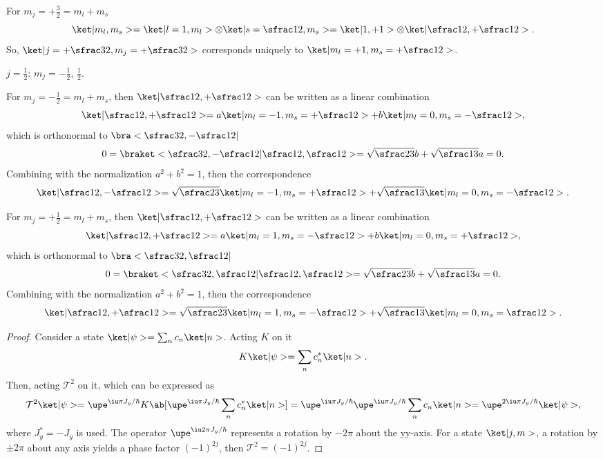 \begin{solution}
\begin{enumext}
\begin{enumext}
\begin{enumext}[label = \arabic*.]
\[        \]
        \item For $m_j = +\frac32 = m_l + m_s$
        \[
          \ket|m_l, m_s> = \ket|l = 1, m_l> \otimes \ket|s = \sfrac12, m_s>
        = \ket|1, +1> \otimes \ket|\sfrac12, +\sfrac12>.
        \]
        So, $\ket|j = +\sfrac32, m_j = +\sfrac32>$ corresponds uniquely to
        $\ket|m_l = +1, m_s = +\sfrac12>$.
      \end{enumext}
      \item $j = \frac12$: $m_j = -\frac12$, $\frac12$.
      \begin{enumext}[label = \arabic*.]
        \item For $m_j = -\frac12 = m_l + m_s$,
        then $\ket|\sfrac12, +\sfrac12>$ can be written as a linear combination
        \[
          \ket|\sfrac12, +\sfrac12> = a\ket|m_l = -1, m_s = +\sfrac12>
        + b\ket|m_l = 0, m_s = -\sfrac12>,
        \]
        which is orthonormal to $\bra<\sfrac32, -\sfrac12|$
        \[
          0 = \braket<\sfrac32, -\sfrac12|\sfrac12, \sfrac12>
        = \sqrt{\sfrac23} b + \sqrt{\sfrac13} a = 0.
        \]
        Combining with the normalization $a^2 + b^2 = 1$, then the
        correspondence
        \[
          \ket|\sfrac12, -\sfrac12>
        = \sqrt{\sfrac23}\ket|m_l = -1, m_s = +\sfrac12>
          + \sqrt{\sfrac13}\ket|m_l = 0, m_s = -\sfrac12>.
        \]
        \item For $m_j = +\frac12 = m_l + m_s$,
        then $\ket|\sfrac12, +\sfrac12>$ can be written as a linear combination
        \[
          \ket|\sfrac12, +\sfrac12> = a\ket|m_l = 1, m_s = -\sfrac12>
        + b\ket|m_l = 0, m_s = +\sfrac12>,
        \]
        which is orthonormal to $\bra<\sfrac32, \sfrac12|$
        \[
          0 = \braket<\sfrac32, \sfrac12|\sfrac12, \sfrac12>
        = \sqrt{\sfrac23} b + \sqrt{\sfrac13} a = 0.
        \]
        Combining with the normalization $a^2 + b^2 = 1$, then the
        correspondence
        \[
          \ket|\sfrac12, +\sfrac12>
        = \sqrt{\sfrac23}\ket|m_l = 1, m_s = -\sfrac12>
          + \sqrt{\sfrac13}\ket|m_l = 0, m_s = \sfrac12>.
        \]
      \end{enumext}
    \end{enumext}
    \item \begin{proof}
    Consider a state $\ket|\psi> = \sum_n c_n \ket|n>$. Acting $K$ on it
    \[
      K\ket|\psi> = \sum_n c_n^* \ket|n>.
    \]
    Then, acting $\mathcal T^2$ on it, which can be expressed as
    \[
      \mathcal T^2 \ket|\psi>
    = \upe^{\iu\pi J_y/\hbar} K\ab[\upe^{\iu\pi J_y/\hbar} \sum_n c_n^* \ket|n>]
    = \upe^{\iu\pi J_y/\hbar} \upe^{\iu\pi J_y/\hbar} \sum_n c_n \ket|n>
    = \upe^{2\iu\pi J_y/\hbar} \ket|\psi>,
    \]
    where $J_y^* = -J_y$ is used.
    The operator $\upe^{\iu2\pi J_y/\hbar}$ represents a rotation by $-2\pi$
    about the yy-axis. For a state $\ket|j, m>$, a rotation by $\pm 2\pi$ about
    any axis yields a phase factor $(-1)^{2j}$, then $\mathcal T^2 = (-1)^{2j}$.
    \end{proof}
  \end{enumext}
\end{solution}

